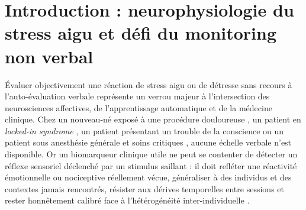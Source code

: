\documentclass[10pt]{article}
\begin{document}
\begin{abstract}
Passer d'un split aléatoire (R1 : $0{,}589$) au double inédit Cold-Start (R4 : $0{,}569$) révèle 70\,\% d'inflation par thèmes vus et $+0{,}041$ d'inflation biométrique poolée sur \texttt{REVE} ; en R4, l'EEG ($-0{,}028^*$) et l'EDA ($-0{,}018^*$) forment les deux piliers complémentaires (ECG isolé $0{,}508$). \textbf{(5)~Stabilité longitudinale J1 $\to$ J2 et habituation.} L'EDA présente la plus faible stabilité tonique ($r = 0{,}420$) et son décodeur chute significativement d'un jour à l'autre ($0{,}560 \to 0{,}523$, $-0{,}039^*$), comme la respiration ($-0{,}030^*$), tandis que l'EEG et le multimodal tiennent ; les pics SCR s'habituent ($-0{,}032^*$), pas le cœur vagal ni l'alpha. \textbf{(6)~Personnalisation $k$-shot et CORAL.} La personnalisation supervisée naïve s'effondre massivement jusqu'à $k = 40$ ($-0{,}081$ à $-0{,}053$) et sur J1 $\to$ J2 ($-0{,}040^*$ à $-0{,}069^*$) ; le \emph{shrinkage} bayésien MAP supprime la chute sans franchir de saut majeur ; CORAL reste neutre en LOCO ($0{,}589 \to 0{,}588$). \textbf{(7)~Cohérence autonome--subjective et monitoring clinique passif.} Sur $N = 314$ ($n = 16\,276$), l'espace affectif se décompose en trois facteurs orthogonaux (EDA, neuro-cardio autonome décorrélé du ressenti, et axe subjectif--cardio-respiratoire) ; 79\,\% des individus sont cohérents en composite (21\,\% discordants ; effet d'intensité $+0{,}101^*$). Agréger 10 épisodes passifs (100~s) en Cold-Start porte l'AUC à $0{,}680$--$0{,}698$ et double la sensibilité à 90\,\% de spécificité (jusqu'à 53\,\%), fixant des bornes quantitatives lucides pour la clinique non verbale.
\end{abstract}

\section{Introduction : neurophysiologie du stress aigu et défi du monitoring non verbal}

Évaluer objectivement une réaction de stress aigu ou de détresse sans recours à l'auto-évaluation verbale représente un verrou majeur à l'intersection des neurosciences affectives, de l'apprentissage automatique et de la médecine clinique. Chez un nouveau-né exposé à une procédure douloureuse \cite{roue2025}, un patient en \emph{locked-in syndrome} \cite{adama2025}, un patient présentant un trouble de la conscience \cite{engemann2018,candia2021} ou un patient sous anesthésie générale et soins critiques \cite{danel2025}, aucune échelle verbale n'est disponible. Or un biomarqueur clinique utile ne peut se contenter de détecter un réflexe sensoriel déclenché par un stimulus saillant : il doit refléter une réactivité émotionnelle ou nociceptive réellement vécue, généraliser à des individus et des contextes jamais rencontrés, résister aux dérives temporelles entre sessions et rester honnêtement calibré face à l'hétérogénéité inter-individuelle \cite{paniagua2025}.
\end{document}
